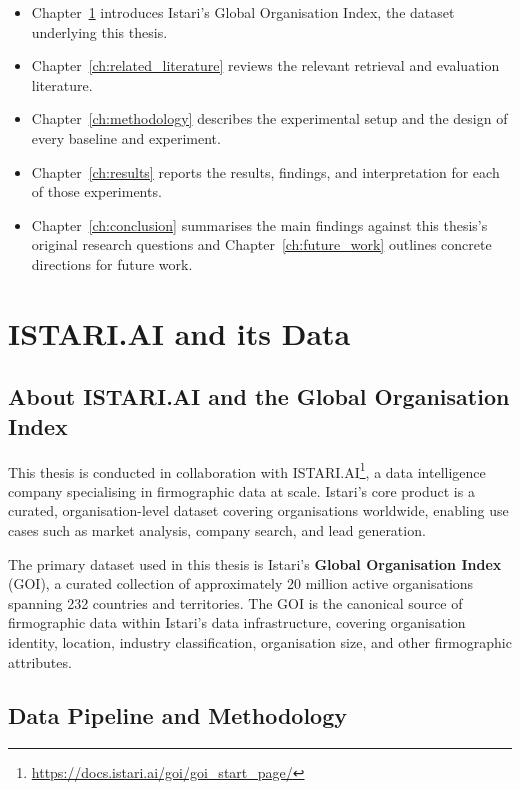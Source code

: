\documentclass[a4paper,oneside,bibliography=totoc]{scrbook}
\begin{document}
\begin{itemize}
\setlength\itemsep{0pt}
\setlength\parskip{0pt}
\item Chapter~\ref{ch:istariAndData} introduces Istari's Global Organisation Index, the dataset underlying this thesis.
\item Chapter~\ref{ch:related_literature} reviews the relevant retrieval and evaluation literature.
\item Chapter~\ref{ch:methodology} describes the experimental setup and the design of every baseline and experiment.
\item Chapter~\ref{ch:results} reports the results, findings, and interpretation for each of those experiments.
\item Chapter~\ref{ch:conclusion} summarises the main findings against this thesis's original research questions and Chapter~\ref{ch:future_work} outlines concrete directions for future work.
\end{itemize}

\chapter{ISTARI.AI and its Data}
\label{ch:istariAndData}

\section{About ISTARI.AI and the Global Organisation Index}

This thesis is conducted in collaboration with ISTARI.AI\protect\footnote{\url{https://docs.istari.ai/goi/goi_start_page/}}, a data intelligence company specialising in firmographic data at scale. Istari's core product is a curated, organisation-level dataset covering organisations worldwide, enabling use cases such as market analysis, company search, and lead generation.

The primary dataset used in this thesis is Istari's \textbf{Global Organisation Index} (GOI), a curated collection of approximately 20 million active organisations spanning 232 countries and territories. The GOI is the canonical source of firmographic data within Istari's data infrastructure, covering organisation identity, location, industry classification, organisation size, and other firmographic attributes. 

\section{Data Pipeline and Methodology}
\end{document}
